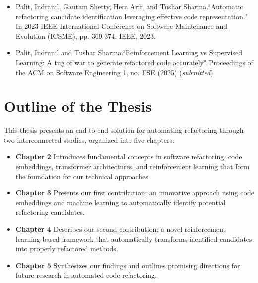 \begin{itemize}
    \item Palit, Indranil, Gautam Shetty, Hera Arif, and Tushar Sharma.``Automatic refactoring candidate identification leveraging effective code representation." In 2023 IEEE International Conference on Software Maintenance and Evolution (ICSME), pp. 369-374. IEEE, 2023.
    
    \item Palit, Indranil and Tushar Sharma.``Reinforcement Learning vs Supervised Learning: A tug of war to generate refactored code accurately" Proceedings of the ACM on Software Engineering 1, no. FSE (2025) (\textit{submitted})
\end{itemize}

\vspace{\fill}
\section{Outline of the Thesis}

This thesis presents an end-to-end solution for automating \exm{} refactoring through two interconnected studies, organized into five chapters:

\begin{itemize}
    \item \textbf{Chapter 2} Introduces fundamental concepts in software refactoring, code embeddings, transformer architectures, and reinforcement learning that form the foundation for our technical approaches.

    \item \textbf{Chapter 3} Presents our first contribution: an innovative approach using code embeddings and machine learning to automatically identify potential \exm{} refactoring candidates.

    \item \textbf{Chapter 4} Describes our second contribution: a novel reinforcement learning-based framework that automatically transforms identified candidates into properly refactored methods.

    \item \textbf{Chapter 5} Synthesizes our findings and outlines promising directions for future research in automated code refactoring.
\end{itemize}
